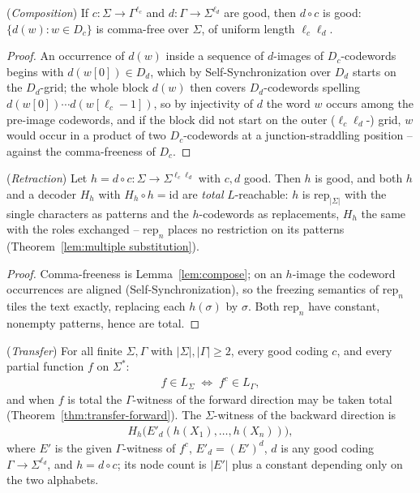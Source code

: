 \documentclass[runningheads,envcountsect]{llncs}
\begin{document}
\begin{lemma}
    (\emph{Composition})
    \label{lem:compose}
    If $c : \Sigma \rightarrow \Gamma^{\ell_c}$ and $d : \Gamma \rightarrow \Sigma^{\ell_d}$ are good, then $d \circ c$ is good: $\{d(w) : w \in D_c\}$ is comma-free over $\Sigma$, of uniform length $\ell_c\ell_d$.
\end{lemma}

\begin{proof}
    An occurrence of $d(w)$ inside a sequence of $d$-images of $D_c$-codewords begins with $d(w[0]) \in D_d$, which by Self-Synchronization over $D_d$ starts on the $D_d$-grid; the whole block $d(w)$ then covers $D_d$-codewords spelling $d(w[0]) \cdots d(w[\ell_c{-}1])$, so by injectivity of $d$ the word $w$ occurs among the pre-image codewords, and if the block did not start on the outer ($\ell_c\ell_d$-) grid, $w$ would occur in a product of two $D_c$-codewords at a junction-straddling position -- against the comma-freeness of $D_c$.
\end{proof}

\begin{lemma}
    (\emph{Retraction})
    \label{lem:retract}
    Let $h = d \circ c : \Sigma \rightarrow \Sigma^{\ell_c\ell_d}$ with $c, d$ good. Then $h$ is good, and both $h$ and a decoder $H_h$ with $H_h \circ h = \mathrm{id}$ are \emph{total} $L$-reachable: $h$ is $\mathrm{rep}_{|\Sigma|}$ with the single characters as patterns and the $h$-codewords as replacements, $H_h$ the same with the roles exchanged -- $\mathrm{rep}_n$ places no restriction on its patterns (Theorem~\ref{lem:multiple substitution}).
\end{lemma}

\begin{proof}
    Comma-freeness is Lemma~\ref{lem:compose}; on an $h$-image the codeword occurrences are aligned (Self-Synchronization), so the freezing semantics of $\mathrm{rep}_n$ tiles the text exactly, replacing each $h(\sigma)$ by $\sigma$. Both $\mathrm{rep}_n$ have constant, nonempty patterns, hence are total.
\end{proof}

\begin{theorem}
    (\emph{Transfer})
    \label{thm:transfer}
    For all finite $\Sigma, \Gamma$ with $|\Sigma|, |\Gamma| \geq 2$, every good coding $c$, and every partial function $f$ on $\Sigma^*$:
    \begin{align}
        f \in L_\Sigma \;\iff\; f^c \in L_\Gamma,
    \end{align}
    and when $f$ is total the $\Gamma$-witness of the forward direction may be taken total (Theorem~\ref{thm:transfer-forward}). The $\Sigma$-witness of the backward direction is
    \begin{align}
        H_h\big(E'_d(h(X_1), \dots, h(X_n))\big),
    \end{align}
    where $E'$ is the given $\Gamma$-witness of $f^c$, $E'_d = (E')^d$, $d$ is any good coding $\Gamma \rightarrow \Sigma^{\ell_d}$, and $h = d \circ c$; its node count is $|E'|$ plus a constant depending only on the two alphabets.
\end{theorem}
\end{document}
